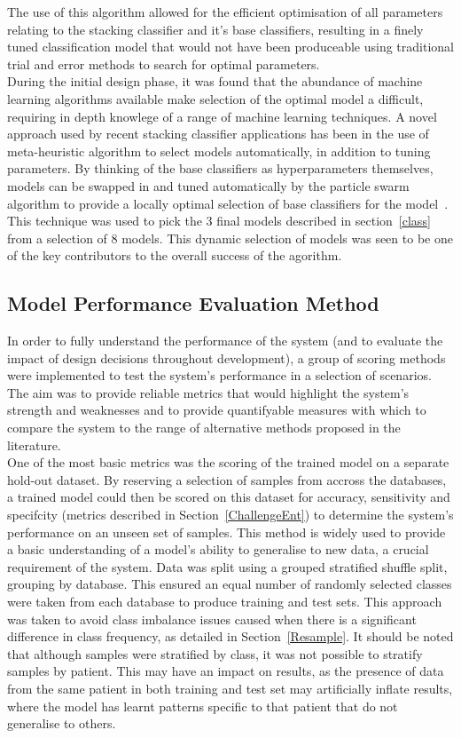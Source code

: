 \documentclass[titlepage, 12pt]{scrartcl} \usepackage{enumitem}
\begin{document}
The use of this algorithm allowed for the efficient optimisation of all parameters
relating to the stacking classifier and it's base classifiers, resulting in a
finely tuned classification model that would not have been produceable using
traditional trial and error methods to search for optimal parameters.\\
During the initial design phase, it was found that the abundance of machine
learning algorithms available make selection of the optimal model a difficult,
requiring in depth knowlege of a range of machine learning techniques. A novel
approach used by recent stacking classifier applications has been in the use of
meta-heuristic algorithm to select models automatically, in addition to tuning
parameters. By thinking of the base classifiers as hyperparameters themselves,
models can be swapped in and tuned automatically by the particle swarm
algorithm to provide a locally optimal selection of base classifiers for the
model~\parencite{Sesmero2015}. This technique was used to pick the 3 final
models described in section~\ref{class} from a selection of 8 models. This
dynamic selection of models was seen to be one of the key contributors to the
overall success of the agorithm.

\subsection{Model Performance Evaluation Method}\label{metrics}
In order to fully understand the performance of the system (and to evaluate the
impact of design decisions throughout development), a group of scoring methods
were implemented to test the system's performance in a selection of scenarios.
The aim was to provide reliable metrics that would highlight the system's
strength and weaknesses and to provide quantifyable measures with which to
compare the system to the range of alternative methods proposed in the
literature.\\

One of the most basic metrics was the scoring of the trained model on a
separate hold-out dataset. By reserving a selection of samples from accross the
databases, a trained model could then be scored on this dataset for accuracy, sensitivity and
specifcity (metrics described in Section~\ref{ChallengeEnt}) to determine the
system's performance on an unseen set of samples. This method is widely used to
provide a basic understanding of a model's ability to generalise to new data, a
crucial requirement of the system. Data was split using a grouped stratified shuffle
split, grouping by database. This ensured an equal number of randomly selected
classes were taken from each database to produce training and test sets. This
approach was taken to avoid class imbalance issues caused when there is a
significant difference in class frequency, as detailed in
Section~\ref{Resample}. It should be noted that although samples were
stratified by class, it was not possible to stratify samples by patient. This
may have an impact on results, as the presence of data from the same patient in
both training and test set may artificially inflate results, where the model has
learnt patterns specific to that patient that do not generalise to others.\\
\end{document}
